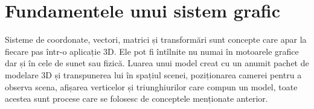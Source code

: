 \chapter{Fundamentele unui sistem grafic}
\label{ch1}

Sisteme de coordonate, vectori, matrici și transformări sunt concepte care apar
la fiecare pas într-o aplicație 3D. Ele pot fi întîlnite nu numai în motoarele
grafice dar și în cele de sunet sau fizică. Luarea unui model creat cu un anumit pachet
de modelare 3D și transpunerea lui în spațiul scenei, poziționarea camerei
pentru a observa scena, afișarea verticelor și triunghiurilor care compun un model,
toate acestea sunt procese care se folosesc de conceptele menționate anterior.

